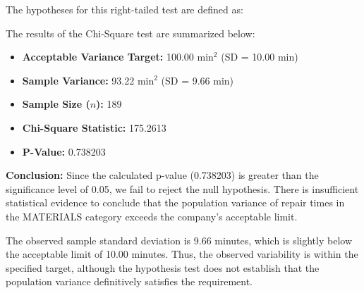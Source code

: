 \vspace{2cm}
The hypotheses for this right-tailed test are defined as:

\begin{center}
\end{center}

The results of the Chi-Square test are summarized below:

\begin{itemize}
    \item \textbf{Acceptable Variance Target:}
    100.00 $\text{min}^2$ (SD = 10.00 min)

    \item \textbf{Sample Variance:}
    93.22 $\text{min}^2$ (SD = 9.66 min)

    \item \textbf{Sample Size ($n$):} 189

    \item \textbf{Chi-Square Statistic:} 175.2613

    \item \textbf{P-Value:} 0.738203
\end{itemize}

\textbf{Conclusion:}
Since the calculated p-value (0.738203) is greater than the
significance level of 0.05, we fail to reject the null hypothesis.
There is insufficient statistical evidence to conclude that the
population variance of repair times in the MATERIALS category exceeds
the company's acceptable limit.

The observed sample standard deviation is 9.66 minutes, which is
slightly below the acceptable limit of 10.00 minutes. Thus, the
observed variability is within the specified target, although the
hypothesis test does not establish that the population variance
definitively satisfies the requirement.


